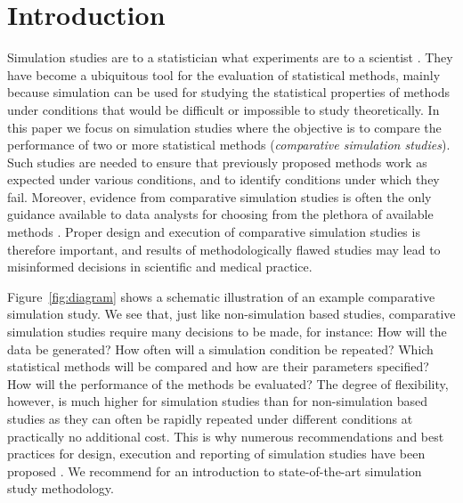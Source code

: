 \documentclass[a4paper, 11pt]{article}
\begin{document}
\section{Introduction}


Simulation studies are to a statistician what experiments are to a scientist
\citep{Hoaglin1975}. They have become a ubiquitous tool for the evaluation of
statistical methods, mainly because simulation can be used
for studying the statistical properties of methods under
conditions that would be difficult or impossible to study theoretically.
In this paper we focus on simulation studies where the objective is to compare
the performance of two or more statistical methods (\emph{comparative simulation
studies}). Such studies are needed to ensure that previously proposed methods
work as expected under various conditions, and to identify conditions under which
they fail. Moreover, evidence from comparative simulation studies is often the
only guidance available to data analysts for choosing from the plethora of
available methods \citep{Boulesteix2013, Boulesteix2017b}. Proper design and
execution of comparative simulation studies is therefore important, and
results of methodologically flawed studies may lead to misinformed
decisions in scientific and medical practice.

Figure~\ref{fig:diagram} shows a schematic illustration of an example
comparative simulation study. We see that, just like non-simulation based studies, comparative simulation
studies require many decisions to be made, for instance: How will the data be generated?
How often will a simulation condition be repeated? Which statistical methods will be
compared and how are their parameters specified? How will the performance of the methods
be evaluated? The degree of flexibility, however, is much higher for simulation studies
than for non-simulation based studies as they can often be rapidly repeated under
different conditions at practically no additional cost. This is why numerous recommendations
and best practices for design, execution and reporting of simulation studies
have been proposed \citep{Hoaglin1975, Holford2000, Burton2006, Smith2010,
OKelly2016, Monks2018, Elofsson2019, Morris2019, Boulesteix2020B}. We
recommend \citet{Morris2019} for an introduction to state-of-the-art simulation
study methodology.
\end{document}
